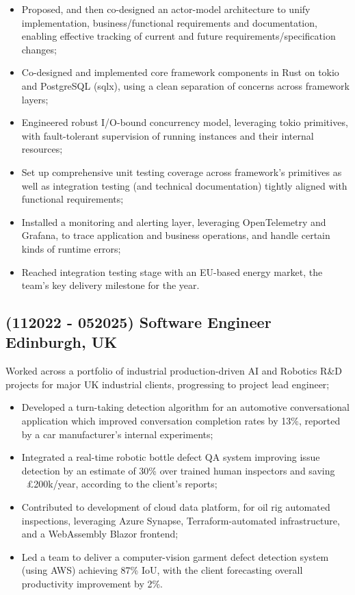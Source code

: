 ﻿\documentclass[11pt]{article}
\newcommand{\UList}[1]{
\begin{itemize}[leftmargin=*]
  #1
\end{itemize}
}
\begin{document}
\UList{
  \item Proposed, and then co-designed an actor-model architecture to unify implementation, business/functional requirements and documentation, enabling effective tracking of current and future requirements/specification changes;

  \item Co-designed and implemented core framework components in Rust on tokio and PostgreSQL (sqlx), using a clean separation of concerns across framework layers;

  \item Engineered robust I/O-bound concurrency model, leveraging tokio primitives, with fault-tolerant supervision of running instances and their internal resources;

  \item Set up comprehensive unit testing coverage across framework's primitives as well as integration testing (and technical documentation) tightly aligned with functional requirements;

  \item Installed a monitoring and alerting layer, leveraging OpenTelemetry and Grafana, to trace application and business operations, and handle certain kinds of runtime errors;

  \item Reached integration testing stage with an EU-based energy market, the team's key delivery milestone for the year.
}

\subsection{(112022 - 052025) Software Engineer \hfill {}  \hfill Edinburgh, UK}

Worked across a portfolio of industrial production-driven AI and Robotics R\&D projects for major UK industrial clients, progressing to project lead engineer;

\UList{
  \item Developed a turn-taking detection algorithm for an automotive conversational application which improved conversation completion rates by 13\%, reported by a car manufacturer's internal experiments;
  \item Integrated a real-time robotic bottle defect QA system improving issue detection by an estimate of 30\% over trained human inspectors and saving ~£200k/year, according to the client's reports;
  \item Contributed to development of cloud data platform, for oil rig automated inspections, leveraging Azure Synapse, Terraform-automated infrastructure, and a WebAssembly Blazor frontend;
  \item Led a team to deliver a computer-vision garment defect detection system (using AWS) achieving 87\% IoU, with the client forecasting overall productivity improvement by 2\%.

}
\end{document}
